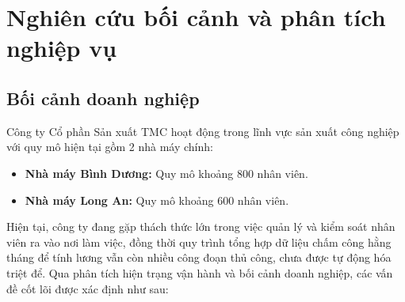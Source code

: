 \section{Nghiên cứu bối cảnh và phân tích nghiệp vụ}
\subsection{Bối cảnh doanh nghiệp}
Công ty Cổ phần Sản xuất TMC hoạt động trong lĩnh vực sản xuất công nghiệp với quy mô hiện tại gồm 2 nhà máy chính:
\begin{itemize}
    \item \textbf{Nhà máy Bình Dương:} Quy mô khoảng 800 nhân viên.
    \item \textbf{Nhà máy Long An:} Quy mô khoảng 600 nhân viên.
\end{itemize}
Hiện tại, công ty đang gặp thách thức lớn trong việc quản lý và kiểm soát nhân viên ra vào nơi làm việc, đồng thời quy trình tổng hợp dữ liệu chấm công hằng tháng để tính lương vẫn còn nhiều công đoạn thủ công, chưa được tự động hóa triệt để. Qua phân tích hiện trạng vận hành và bối cảnh doanh nghiệp, các vấn đề cốt lõi được xác định như sau:

